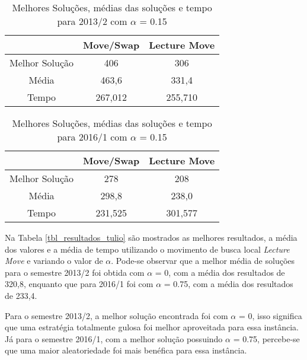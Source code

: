 \begin{table}[!htbp]
\centering
\begin{tabular}{|c|c|c|}
\hline
 & Move/Swap & Lecture Move \\ \hline
Melhor Solução & 406 & 306 \\ \hline
Média & 463,6 & 331,4 \\ \hline
Tempo & 267,012 & 255,710 \\ \hline
\end{tabular}
\caption{Melhores Soluções, médias das soluções e tempo para 2013/2 com \(\alpha\) = 0.15}
\label{tbl_resultados_alfa152013}
\end{table}

\begin{table}[!htbp]
\centering
\begin{tabular}{|c|c|c|}
\hline
 & Move/Swap & Lecture Move \\ \hline
Melhor Solução & 278 & 208 \\ \hline
Média & 298,8 & 238,0 \\ \hline
Tempo & 231,525 & 301,577 \\ \hline
\end{tabular}
\caption{Melhores Soluções, médias das soluções e tempo para 2016/1 com \(\alpha\) = 0.15}
\label{tbl_resultados_alfa152016}
\end{table}


Na Tabela \ref{tbl_resultados_tulio} são mostrados as melhores resultados, a média dos valores e a média de tempo utilizando o movimento de busca local \textit{Lecture Move} e variando o valor de \(\alpha\). Pode-se observar que a melhor média de soluções para o semestre 2013/2 foi obtida com \(\alpha\) = 0, com a média dos resultados de 320,8, enquanto que para 2016/1 foi com \(\alpha\) = 0.75, com a média dos resultados de 233,4.

Para o semestre 2013/2, a melhor solução encontrada foi com  \(\alpha\) = 0, isso significa que uma estratégia totalmente gulosa foi melhor aproveitada para essa instância.
Já para o semestre 2016/1, com a melhor solução possuindo  \(\alpha\) = 0.75, percebe-se que uma maior aleatoriedade foi mais benéfica para essa instância.

